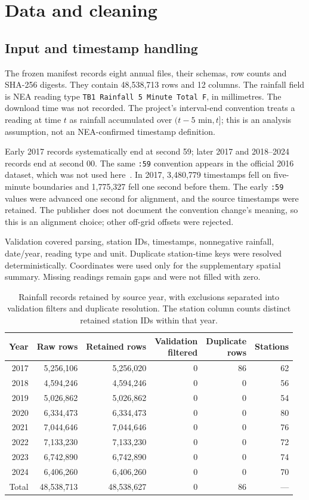 \documentclass[11pt,a4paper]{article}
\begin{document}
\section{Data and cleaning}
\subsection{Input and timestamp handling}
The frozen manifest records eight annual files, their schemas, row counts and
SHA-256 digests. They contain 48,538,713 rows and 12 columns. The rainfall field
is NEA reading type \texttt{TB1 Rainfall 5 Minute Total F}, in millimetres. The
download time was not recorded. The project's
interval-end convention treats a reading at time $t$ as rainfall accumulated
over $(t-5\text{ min},t]$; this is an analysis assumption, not an NEA-confirmed
timestamp definition.

Early 2017 records systematically end at second 59; later 2017 and 2018--2024
records end at second 00. The same \texttt{:59} convention appears in the
official 2016 dataset, which was not used here~\cite{nea}. In 2017, 3,480,779
timestamps fell on five-minute boundaries and 1,775,327 fell one second before
them. The early \texttt{:59} values were advanced one second for alignment, and
the source timestamps were retained. The publisher does not document the
convention change's meaning, so this is an alignment choice; other off-grid
offsets were rejected.

Validation covered parsing, station IDs, timestamps, nonnegative rainfall,
date/year, reading type and unit. Duplicate station-time keys were resolved
deterministically. Coordinates were used only for the supplementary spatial
summary. Missing readings remain gaps and were not filled with zero.

\begin{table}[htbp]
\centering\small
\caption{Rainfall records retained by source year, with exclusions separated
into validation filters and duplicate resolution. The station column counts
distinct retained station IDs within that year.}
\label{tab:cleaning}
\begin{tabular}{r r r r r r}
\toprule
Year & Raw rows & Retained rows & \shortstack{Validation\\filtered} & \shortstack{Duplicate\\rows} & Stations \\
\midrule
2017 & 5,256,106 & 5,256,020 & 0 & 86 & 62 \\
2018 & 4,594,246 & 4,594,246 & 0 & 0 & 56 \\
2019 & 5,026,862 & 5,026,862 & 0 & 0 & 54 \\
2020 & 6,334,473 & 6,334,473 & 0 & 0 & 80 \\
2021 & 7,044,646 & 7,044,646 & 0 & 0 & 76 \\
2022 & 7,133,230 & 7,133,230 & 0 & 0 & 72 \\
2023 & 6,742,890 & 6,742,890 & 0 & 0 & 74 \\
2024 & 6,406,260 & 6,406,260 & 0 & 0 & 70 \\
\midrule
Total & 48,538,713 & 48,538,627 & 0 & 86 & --- \\
\bottomrule
\end{tabular}
\end{table}
\end{document}
